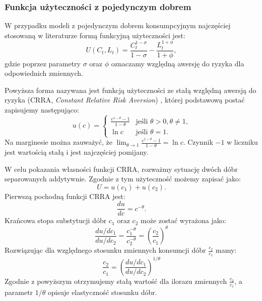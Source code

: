 \subsubsection{Funkcja użyteczności z pojedynczym dobrem}

W przypadku modeli z pojedynczym dobrem konsumpcyjnym najczęściej stosowaną w literaturze formą funkcyjną użyteczności jest:
\begin{equation}
    U(C_t, L_t) = \frac{C^{1-\sigma}_{t}}{1-\sigma} - \frac{L^{1+\phi}_{t}}{1+\phi},
\end{equation}
gdzie poprzez parametry $\sigma$ oraz $\phi$ oznaczamy względną awersję do ryzyka dla odpowiednich zmiennych.

Powyższa forma nazywana jest funkcją użyteczności ze stałą względną awersją do ryzyka (CRRA, \emph{Constant Relative Risk Aversion}) \cite{isoelastic}, której podstawową postać zapisujemy następująco:
\begin{equation}
    u(c) =
     \begin{cases}
       \frac{c^{1-\theta} - 1}{1-\theta} & \text{jeśli $\theta > 0, \theta \neq 1$,} \\
       \ln c & \text{jeśli $\theta = 1$.} 
     \end{cases}
\end{equation}
Na marginesie można zauważyć, że $\lim_{\theta \to 1} \frac{c^{1-\theta} - 1}{1-\theta} = \ln{c}$. Czynnik $-1$ w liczniku jest wartością stałą i jest najczęściej pomijany.

W celu pokazania własności funkcji CRRA, rozważmy sytuację dwóch dóbr separowanych addytywnie. Zgodnie z tym użyteczność możemy zapisać jako:
\begin{equation}
    U = u(c_1) + u(c_2).
\end{equation}
Pierwszą pochodną funkcji CRRA jest:
\begin{equation}
    \frac{d u}{d c} = c^{-\theta}.
\end{equation}
Krańcowa stopa substytucji dóbr $c_1$ oraz $c_2$ może zostać wyrażona jako:
\begin{equation}
    \frac{d u/d c_1}{d u/d c_2} = \frac{c_1^{-\theta}}{c_2^{-\theta}} = \left(\frac{c_2}{c_1}\right)^\theta
\end{equation}
Rozwiązując dla względnego stosunku zmiennych konsumcji dóbr $\frac{c_2}{c_1}$ mamy:
\begin{equation}
    \frac{c_2}{c_1} = \left(\frac{d u/d c_1}{d u/d c_2}\right)^{1/\theta}
\end{equation}
Zgodnie z powyższym otrzymujemy stałą wartość dla ilorazu zmiennych $\frac{c_2}{c_1}$, a parametr $1/\theta$ opisuje elastyczność stosunku dóbr.

